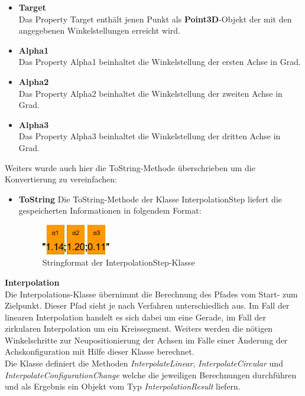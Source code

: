 \begin{itemize}
\item \textbf{Target}\\
Das Property Target enthält jenen Punkt als \textbf{Point3D}-Objekt der mit den angegebenen Winkelstellungen erreicht wird.
\item \textbf{Alpha1}\\
Das Property Alpha1 beinhaltet die Winkelstellung der ersten Achse in Grad.
\item \textbf{Alpha2}\\
Das Property Alpha2 beinhaltet die Winkelstellung der zweiten Achse in Grad.
\item \textbf{Alpha3}\\
Das Property Alpha3 beinhaltet die Winkelstellung der dritten Achse in Grad.
\end{itemize} 
Weiters wurde auch hier die ToString-Methode überschrieben um die Konvertierung zu vereinfachen:
\begin{itemize}
\item \textbf{ToString}
Die ToString-Methode der Klasse InterpolationStep liefert die gespeicherten Informationen in folgendem Format:\\
\begin{figure}[H]
  \centering
  \begin{minipage}[t]{16.5 cm}
  	\centering
  	\includegraphics[width=3cm]{images/InterpolationStep} 
    \caption{Stringformat der InterpolationStep-Klasse}
  \end{minipage}
\end{figure}
\end{itemize}
\newpage
\textbf{Interpolation}\\
Die Interpolations-Klasse übernimmt die Berechnung des Pfades vom Start- zum Zielpunkt. Dieser Pfad sieht je nach Verfahren unterschiedlich aus. Im Fall der linearen Interpolation handelt es sich dabei um eine Gerade, im Fall der zirkularen Interpolation um ein Kreissegment. Weiters werden die nötigen Winkelschritte zur Neupositionierung der Achsen im Falle einer Änderung der Achskonfiguration mit Hilfe dieser Klasse berechnet.\\
Die Klasse definiert die Methoden \textit{InterpolateLinear}, \textit{InterpolateCircular} und \textit{InterpolateConfigurationChange} welche die jeweiligen Berechnungen durchführen und als Ergebnis ein Objekt vom Typ \textit{InterpolationResult} liefern.\\
